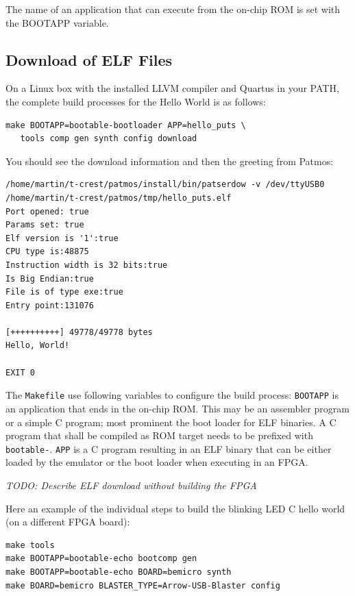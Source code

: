 \documentclass[a4paper,fontsize=10pt,twoside,DIV15,BCOR12mm,headinclude=true,footinclude=false,pagesize,bibtotoc]{scrbook}
\newcommand{\code}[1]{{\texttt{#1}}}
\newcommand{\todo}[1]{{\emph{TODO: #1}}}
\begin{document}
The name of an application that can execute from the on-chip ROM is set
with the BOOTAPP variable.

\subsection{Download of ELF Files}
\label{sec:elf:files}

On a Linux box with the installed LLVM compiler and Quartus in your PATH,
the complete build processes for the Hello World is as follows:

\begin{verbatim}
make BOOTAPP=bootable-bootloader APP=hello_puts \
   tools comp gen synth config download
\end{verbatim}

You should see the download information and then the greeting from Patmos:

\begin{verbatim}
/home/martin/t-crest/patmos/install/bin/patserdow -v /dev/ttyUSB0 /home/martin/t-crest/patmos/tmp/hello_puts.elf
Port opened: true
Params set: true
Elf version is '1':true
CPU type is:48875
Instruction width is 32 bits:true
Is Big Endian:true
File is of type exe:true
Entry point:131076

[++++++++++] 49778/49778 bytes
Hello, World!

EXIT 0
\end{verbatim}

The \code{Makefile} use following variables to configure the build process:
\code{BOOTAPP} is an application that ends in the on-chip ROM. This may
be an assembler program or a simple C program;
most prominent the boot loader for ELF binaries.
A C program that shall be compiled as ROM target needs to be prefixed
with \code{bootable-}.
\code{APP} is a C program resulting in an ELF binary that can be either
loaded by the emulator or the boot loader when executing in an FPGA.

\todo{Describe ELF download without building the FPGA}


Here an example of the individual steps to build the blinking LED C
hello world (on a different FPGA board):
\begin{verbatim}
make tools
make BOOTAPP=bootable-echo bootcomp gen
make BOOTAPP=bootable-echo BOARD=bemicro synth
make BOARD=bemicro BLASTER_TYPE=Arrow-USB-Blaster config
\end{verbatim}
\end{document}
